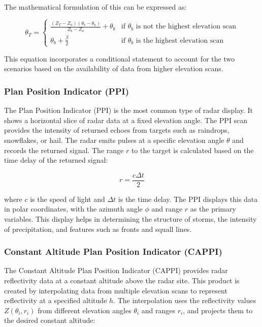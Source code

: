 The mathematical formulation of this can be expressed as:

\[ 
\theta_T = \begin{cases} 
\frac{(Z_T - Z_a)(\theta_b - \theta_a)}{Z_b - Z_a} + \theta_b & \text{if } \theta_b \text{ is not the highest elevation scan} \\
\theta_b + \frac{\beta}{2} & \text{if } \theta_b \text{ is the highest elevation scan} 
\end{cases}
\]

This equation incorporates a conditional statement to account for the two
scenarios based on the availability of data from higher elevation scans.

\subsubsection{Plan Position Indicator (PPI)}

The Plan Position Indicator (PPI) is the most common type of radar display. It
shows a horizontal slice of radar data at a fixed elevation angle. The PPI scan
provides the intensity of returned echoes from targets such as raindrops,
snowflakes, or hail. The radar emits pulses at a specific elevation angle
$\theta$ and records the returned signal. The range $r$ to the target is
calculated based on the time delay of the returned signal:

\[
r = \frac{c \Delta t}{2}
\]

where $c$ is the speed of light and $\Delta t$ is the time delay. The PPI
displays this data in polar coordinates, with the azimuth angle $\phi$ and range
$r$ as the primary variables. This display helps in determining the structure of
storms, the intensity of precipitation, and features such as fronts and squall
lines.

\subsubsection{Constant Altitude Plan Position Indicator (CAPPI)}

The Constant Altitude Plan Position Indicator (CAPPI) provides radar
reflectivity data at a constant altitude above the radar site. This product is
created by interpolating data from multiple elevation scans to represent
reflectivity at a specified altitude $h$. The interpolation uses the
reflectivity values $Z(\theta_i, r_i)$ from different elevation angles
$\theta_i$ and ranges $r_i$, and projects them to the desired constant altitude:

